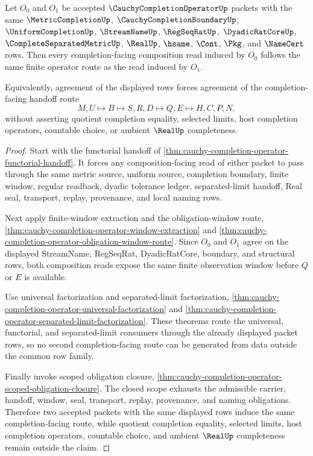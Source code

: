 \begin{theorem}
\label{thm:cauchy-completion-operator-composition-uniqueness-route}
Let $O_0$ and $O_1$ be accepted $\CauchyCompletionOperatorUp$ packets with the same $\MetricCompletionUp$, $\CauchyCompletionBoundaryUp$, $\UniformCompletionUp$, $\StreamNameUp$, $\RegSeqRatUp$, $\DyadicRatCoreUp$, $\CompleteSeparatedMetricUp$, $\RealUp$, $\hsame$, $\Cont$, $\Pkg$, and $\NameCert$ rows. Then every completion-facing composition read induced by $O_0$ follows the same finite operator route as the read induced by $O_1$.

Equivalently, agreement of the displayed rows forces agreement of the completion-facing handoff route
$$
M,U \longmapsto B \longmapsto S,R,D \longmapsto Q,E \longmapsto H,C,P,N,
$$
without asserting quotient completion equality, selected limits, host completion operators, countable choice, or ambient $\RealUp$ completeness.
\end{theorem}
\begin{proof}
Start with the functorial handoff of \autoref{thm:cauchy-completion-operator-functorial-handoff}. It forces any composition-facing read of either packet to pass through the same metric source, uniform source, completion boundary, finite window, regular readback, dyadic tolerance ledger, separated-limit handoff, Real seal, transport, replay, provenance, and local naming rows.

Next apply finite-window extraction and the obligation-window route, \autoref{thm:cauchy-completion-operator-window-extraction} and \autoref{thm:cauchy-completion-operator-obligation-window-route}. Since $O_0$ and $O_1$ agree on the displayed StreamName, RegSeqRat, DyadicRatCore, boundary, and structural rows, both composition reads expose the same finite observation window before $Q$ or $E$ is available.

Use universal factorization and separated-limit factorization, \autoref{thm:cauchy-completion-operator-universal-factorization} and \autoref{thm:cauchy-completion-operator-separated-limit-factorization}. These theorems route the universal, functorial, and separated-limit consumers through the already displayed packet rows, so no second completion-facing route can be generated from data outside the common row family.

Finally invoke scoped obligation closure, \autoref{thm:cauchy-completion-operator-scoped-obligation-closure}. The closed scope exhausts the admissible carrier, handoff, window, seal, transport, replay, provenance, and naming obligations. Therefore two accepted packets with the same displayed rows induce the same completion-facing route, while quotient completion equality, selected limits, host completion operators, countable choice, and ambient $\RealUp$ completeness remain outside the claim.
\end{proof}

